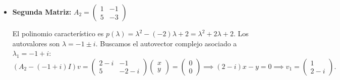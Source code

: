{\begin{itemize}
        Para $\lambda_2 = 6$:
        \[
            (A_1 - 6I)v_2 = \begin{pmatrix} -7 & 2 \\ -7 & 2 \end{pmatrix} \begin{pmatrix} x \\ y \end{pmatrix} = \begin{pmatrix} 0 \\ 0 \end{pmatrix} \implies v_2 = \begin{pmatrix} 2 \\ 7 \end{pmatrix}.
        \]
        
        Dado que ambos autovalores son reales y distintos, las soluciones reales y complejas tienen exactamente la misma forma algebraica (difieren únicamente en el cuerpo al que pertenecen las constantes $C_1, C_2$). La \textbf{solución general} es:
        \[
            u(t) = C_1 e^t \begin{pmatrix} 1 \\ 1 \end{pmatrix} + C_2 e^{6t} \begin{pmatrix} 2 \\ 7 \end{pmatrix}, \quad C_1, C_2 \in \mathbb{K} \text{ (donde } \mathbb{K}=\mathbb{R} \text{ o } \mathbb{C}).
        \]
        \item \textbf{Segunda Matriz:} $A_2 = \begin{pmatrix} 1 & -1 \\ 5 & -3 \end{pmatrix}$
    
        El polinomio característico es $p(\lambda) = \lambda^2 - (-2)\lambda + 2 = \lambda^2 + 2\lambda + 2$. Los autovalores son $\lambda = -1 \pm i$.
        Buscamos el autovector complejo asociado a $\lambda_1 = -1 + i$:
        \[
            (A_2 - (-1+i)I)v = \begin{pmatrix} 2-i & -1 \\ 5 & -2-i \end{pmatrix} \begin{pmatrix} x \\ y \end{pmatrix} = \begin{pmatrix} 0 \\ 0 \end{pmatrix} \implies (2-i)x - y = 0 \implies v_1 = \begin{pmatrix} 1 \\ 2-i \end{pmatrix}.
        \]
        

\end{itemize}}
